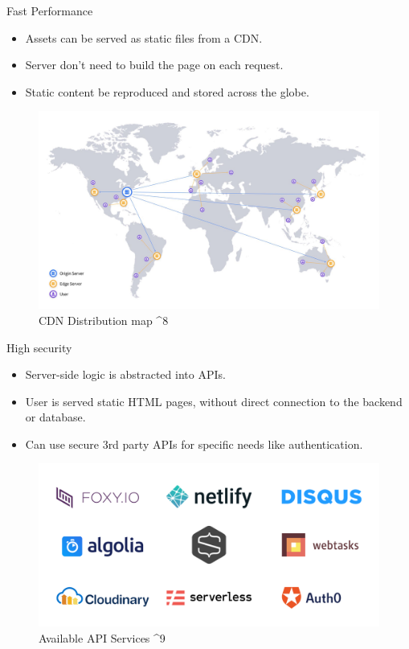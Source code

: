 \documentclass[aspectratio=169,9pt]{beamer}
\begin{document}
\begin{frame}{Fast Performance}
    \vspace{2em}
    \begin{itemize}
        \item Assets can be served as static files from a CDN.
        \item Server don't need to build the page on each request.
        \item Static content be reproduced and stored across the globe.
    \end{itemize}
    \vfill
    \begin{figure}
        \includegraphics[scale=.1]{images/cdn-distribution-map.jpg}
        \caption{CDN Distribution map ^8}
    \end{figure}
\end{frame}

\begin{frame}{High security}
    \vspace{2em}
    \begin{itemize}
        \item Server-side logic is abstracted into APIs.
        \item User is served static HTML pages, without direct connection to the backend or database.
        \item Can use secure 3rd party APIs for specific needs like authentication.
    \end{itemize}
    \vfill
    \begin{figure}
        \includegraphics[scale=.15]{images/apis.png}
        \caption{Available API Services ^9}
    \end{figure}
    
\end{frame}
\end{document}

